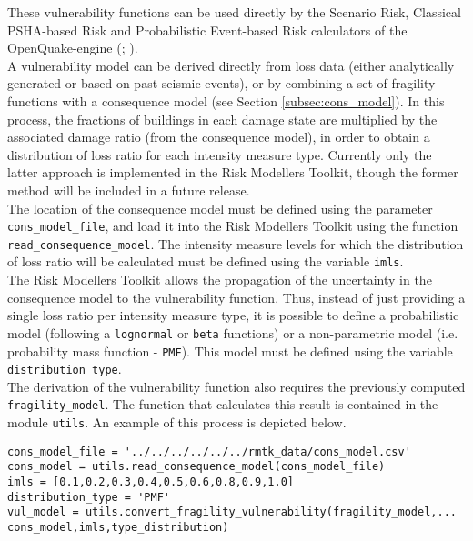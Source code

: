 These vulnerability functions can be used directly by the Scenario Risk, Classical PSHA-based Risk and Probabilistic Event-based Risk calculators of the OpenQuake-engine (\cite{SilvaEtAl2014a}; \cite{PaganiEtAl2014a}). \\

A vulnerability model can be derived directly from loss data (either analytically generated or based on past seismic events), or by combining a set of fragility functions with a consequence model (see Section \ref{subsec:cons_model}). In this process, the fractions of buildings in each damage state are multiplied by the associated damage ratio (from the consequence model), in order to obtain a distribution of loss ratio for each intensity measure type. Currently only the latter approach is implemented in the Risk Modellers Toolkit, though the former method will be included in a future release.\\

The location of the consequence model must be defined using the parameter \verb=cons_model_file=, and load it into the Risk Modellers Toolkit using the function \verb=read_consequence_model=. The intensity measure levels for which the distribution of loss ratio will be calculated must be defined using the variable \verb=imls=.\\

The Risk Modellers Toolkit allows the propagation of the uncertainty in the consequence model to the vulnerability function. Thus, instead of just providing a single loss ratio per intensity measure type, it is possible to define a probabilistic model (following a \verb=lognormal= or \verb=beta= functions) or a non-parametric model (i.e. probability mass function - \verb=PMF=). This model must be defined using the variable \verb= distribution_type=.\\

The derivation of the vulnerability function also requires the previously computed \verb=fragility_model=. The function that calculates this result is contained in the module \verb=utils=. An example of this process is depicted below.

\begin{Verbatim}[frame=single, commandchars=\\\{\}, samepage=true]
cons_model_file = '../../../../../../rmtk_data/cons_model.csv'
cons_model = utils.read_consequence_model(cons_model_file)
imls = [0.1,0.2,0.3,0.4,0.5,0.6,0.8,0.9,1.0]
distribution_type = 'PMF'
vul_model = utils.convert_fragility_vulnerability(fragility_model,...
cons_model,imls,type_distribution)
\end{Verbatim}

